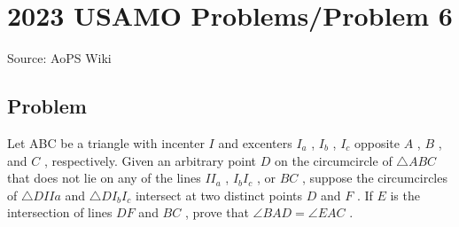 \documentclass[12pt]{article}
\begin{document}
\section*{{2023 USAMO Problems/Problem 6}}
Source: AoPS Wiki

\subsection*{Problem}
Let ABC be a triangle with incenter $I$ and excenters $I_a$ , $I_b$ , $I_c$ opposite $A$ , $B$ , and $C$ , respectively. Given an arbitrary point $D$ on the circumcircle of $\triangle ABC$ that does not lie on any of the lines $II_{a}$ , $I_{b}I_{c}$ , or $BC$ , suppose the circumcircles of $\triangle DIIa$ and $\triangle DI_bI_c$ intersect at two distinct points $D$ and $F$ . If $E$ is the intersection of lines $DF$ and $BC$ , prove that $\angle BAD = \angle EAC$ .
\end{document}
